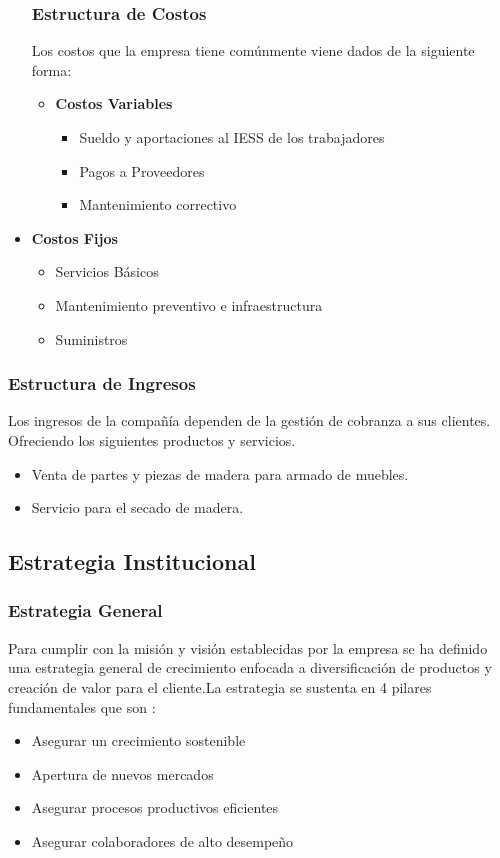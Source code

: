 \documentclass[12pt, a4paper]{article}
\begin{document}
\begin{itemize}
\subsubsection{Estructura de Costos}
Los costos que la empresa tiene comúnmente viene dados de la siguiente forma:
\begin {itemize}
	\item \textbf {Costos Variables}
		\begin {itemize}
			\item Sueldo y aportaciones al IESS de los trabajadores	
			\item Pagos a Proveedores 
			\item Mantenimiento correctivo
			\end{itemize}

\end{itemize}		
	\item \textbf {Costos Fijos}
		\begin {itemize}
			\item Servicios Básicos
			\item Mantenimiento preventivo e infraestructura
			\item Suministros 
			\end{itemize}
		\end{itemize}
\subsubsection{Estructura de Ingresos}

Los ingresos de la compañía dependen de la gestión de cobranza a sus clientes. Ofreciendo los siguientes productos y servicios.
\begin {itemize}
	\item Venta  de partes y piezas de madera para armado de muebles.
	\item Servicio para el secado de madera.
\end{itemize}

\subsection{Estrategia Institucional}
\subsubsection{Estrategia General}
Para cumplir con la misión y visión establecidas por la empresa se ha definido una estrategia general de crecimiento enfocada a diversificación de productos y creación de valor para el cliente.La estrategia se sustenta en  4 pilares fundamentales que son :
\begin{itemize}
	\item  Asegurar un crecimiento sostenible 
	\item  Apertura de nuevos mercados
	 \item Asegurar procesos productivos eficientes
	\item Asegurar colaboradores de alto desempeño
\end{itemize}
\end{document}
